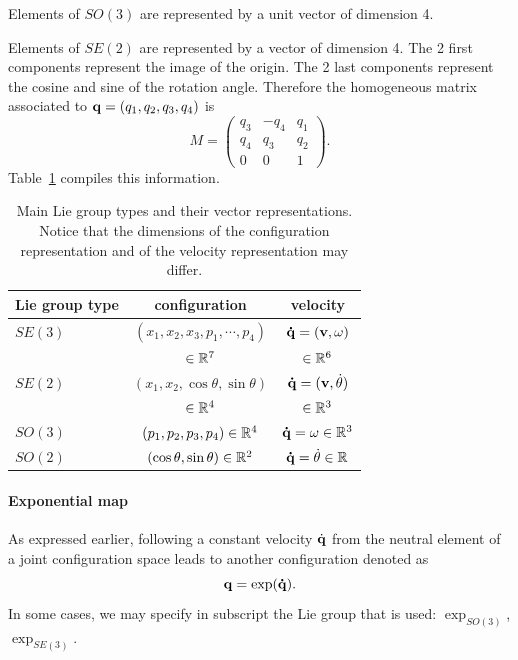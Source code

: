 Elements of $SO(3)$ are represented by a unit vector of dimension 4.

Elements of $SE(2)$ are represented by a vector of dimension 4. The 2 first components represent the image of the origin. The 2 last components represent the cosine and sine of the rotation angle. Therefore the homogeneous matrix associated to $\mathbf{q}=(q_1,q_2,q_3,q_4)$ is
$$
M = \left(\begin{array}{lll}
  q_3 & -q_4 & q_1 \\
  q_4 &  q_3 & q_2 \\
  0   &  0  & 1
\end{array}\right).
$$
Table~\ref{tab:vector representation} compiles this information.
\begin{table}
  \begin{tabular}{|l|c|c|}
    \hline
    Lie group type & configuration & velocity\\
    \hline
    $SE(3)$ & $(x_1,x_2,x_3,p_1,\cdots,p_4)$ & $\mathbf{\dot{q}}=(\mathbf{v},\omega)$ \\
            & $\in\mathbb{R}^7$                 & $\in\mathbb{R}^6$ \\
    $SE(2)$ & $(x_1,x_2,\cos\theta,\sin\theta)$ & $\mathbf{\dot{q}}=(\mathbf{v},\dot{\theta})$\\
            & $\in\mathbb{R}^4$                 & $\in\mathbb{R}^3$ \\
    $SO(3)$ & $(p_1,p_2,p_3,p_4)\in\mathbb{R}^4$ & $\mathbf{\dot{q}}=\omega\in\mathbb{R}^3$\\
    $SO(2)$ & $(\cos\theta,\sin\theta)\in\mathbb{R}^2$ & $\mathbf{\dot{q}}=\dot{\theta}\in\mathbb{R}$\\
    \hline
  \end{tabular}
  \caption{Main Lie group types and their vector representations. Notice that the dimensions of the configuration representation and of the velocity representation may differ.}
  \label{tab:vector representation}
\end{table}

\paragraph{Exponential map}

As expressed earlier, following a constant velocity $\dot{\mathbf{q}}$ from the neutral element of a joint configuration space leads to another configuration denoted as
$$
\mathbf{q} = \exp(\mathbf{\dot{q}}).
$$
In some cases, we may specify in subscript the Lie group that is used: \href{https://github.com/stack-of-tasks/pinocchio/blob/f8f3b9a24eab527df79650e3dc73410f9a46a2b2/src/spatial/explog.hpp#L34}{$\exp_{SO(3)}$}, \href{https://github.com/stack-of-tasks/pinocchio/blob/f8f3b9a24eab527df79650e3dc73410f9a46a2b2/src/spatial/explog.hpp#L236}{$\exp_{SE(3)}$}.

